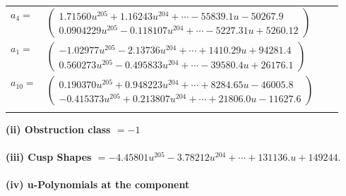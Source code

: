 \documentclass[1p]{elsarticle_modified}
\theoremstyle{definition}
\begin{document}
\begin{tabular}{m{7pt} m{180pt} m{7pt} m{180pt} }
\flushright $a_{4}=$&$\begin{pmatrix}1.71560 u^{205}+1.16243 u^{204}+\cdots-55839.1 u-50267.9\\0.0904229 u^{205}-0.118107 u^{204}+\cdots-5227.31 u+5260.12\end{pmatrix}$ \\
\flushright $a_{1}=$&$\begin{pmatrix}-1.02977 u^{205}-2.13736 u^{204}+\cdots+1410.29 u+94281.4\\0.560273 u^{205}-0.495833 u^{204}+\cdots-39580.4 u+26176.1\end{pmatrix}$ \\
\flushright $a_{10}=$&$\begin{pmatrix}0.190370 u^{205}+0.948223 u^{204}+\cdots+8284.65 u-46005.8\\-0.415373 u^{205}+0.213807 u^{204}+\cdots+21806.0 u-11627.6\end{pmatrix}$\\&\end{tabular}
\flushleft \textbf{(ii) Obstruction class $= -1$}\\~\\
\flushleft \textbf{(iii) Cusp Shapes $= -4.45801 u^{205}-3.78212 u^{204}+\cdots+131136. u+149244.$}\\~\\
\newpage\renewcommand{\arraystretch}{1}
\flushleft \textbf{(iv) u-Polynomials at the component}\newline \\
\end{document}

